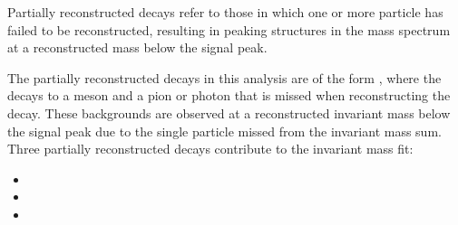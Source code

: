 Partially reconstructed decays refer to those in which one or more particle has failed to be reconstructed, resulting in peaking structures in the \B mass spectrum at a reconstructed mass below the signal peak. 

The partially reconstructed decays in this analysis are of the form \decay{\B}{\Dstar\Kstar}, where the \Dstar decays to a \Dz meson and a pion or photon that is missed when reconstructing the decay. These backgrounds are observed at a reconstructed invariant mass below the signal peak due to the single particle missed from the invariant mass sum. Three partially reconstructed decays contribute to the invariant mass fit:

\begin{itemize}
\item{\decay{\Bm}{(\decay{\Dstarz}{\Dz[\piz]})\Kstarm}}
\item{\decay{\Bm}{(\decay{\Dstarz}{\Dz[\gamma]})\Kstarm}}
\item{\decay{\Bd}{(\decay{\Dstarp}{\Dz[\pip]})\Kstarm}}
\end{itemize}

